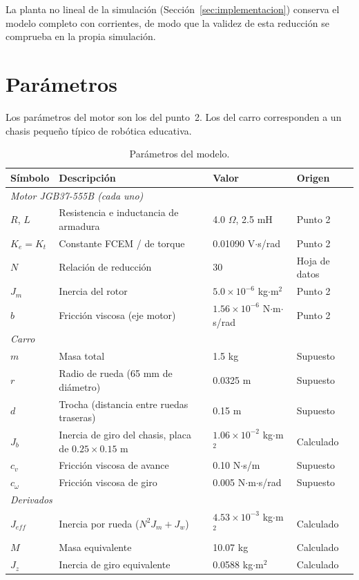 \documentclass[11pt,letterpaper]{article}
\begin{document}
La planta no lineal de la simulación (Sección~\ref{sec:implementacion}) conserva el modelo completo con corrientes, de modo que la validez de esta reducción se comprueba en la propia simulación.

\section{Parámetros}
Los parámetros del motor son los del punto~2. Los del carro corresponden a un chasis pequeño típico de robótica educativa.

\begin{table}[H]
\centering
\caption{Parámetros del modelo.}
\label{tab:parametros}
\small
\begin{tabular}{l l l l}
\toprule
Símbolo & Descripción & Valor & Origen \\
\midrule
\multicolumn{4}{l}{\emph{Motor JGB37-555B (cada uno)}}\\
$R$, $L$ & Resistencia e inductancia de armadura & 4.0 $\Omega$, 2.5 mH & Punto 2 \\
$K_e=K_t$ & Constante FCEM / de torque & 0.01090 V$\cdot$s/rad & Punto 2 \\
$N$ & Relación de reducción & 30 & Hoja de datos \\
$J_m$ & Inercia del rotor & $5.0\times10^{-6}$ kg$\cdot$m$^2$ & Punto 2 \\
$b$ & Fricción viscosa (eje motor) & $1.56\times10^{-6}$ N$\cdot$m$\cdot$s/rad & Punto 2 \\
\midrule
\multicolumn{4}{l}{\emph{Carro}}\\
$m$ & Masa total & 1.5 kg & Supuesto \\
$r$ & Radio de rueda (65 mm de diámetro) & 0.0325 m & Supuesto \\
$d$ & Trocha (distancia entre ruedas traseras) & 0.15 m & Supuesto \\
$J_b$ & Inercia de giro del chasis, placa de $0.25\times0.15$ m & $1.06\times10^{-2}$ kg$\cdot$m$^2$ & Calculado \\
$c_v$ & Fricción viscosa de avance & 0.10 N$\cdot$s/m & Supuesto \\
$c_\omega$ & Fricción viscosa de giro & 0.005 N$\cdot$m$\cdot$s/rad & Supuesto \\
\midrule
\multicolumn{4}{l}{\emph{Derivados}}\\
$J_{eff}$ & Inercia por rueda ($N^2J_m+J_w$) & $4.53\times10^{-3}$ kg$\cdot$m$^2$ & Calculado \\
$M$ & Masa equivalente & 10.07 kg & Calculado \\
$J_z$ & Inercia de giro equivalente & 0.0588 kg$\cdot$m$^2$ & Calculado \\
\bottomrule
\end{tabular}
\end{table}
\end{document}
